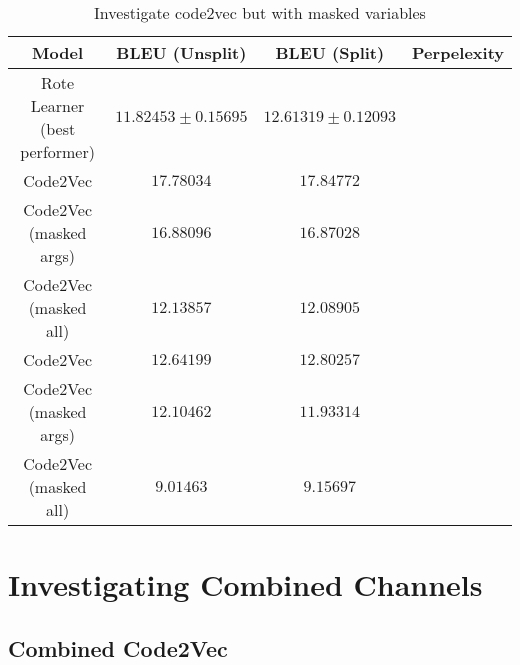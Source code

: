 \begin{table}[h!]
\begin{center}
\begin{tabular}{ c | c | c | c }
    Model                             & BLEU (Unsplit)  & BLEU (Split)    & Perpelexity \\
    \hline
    Rote Learner (best performer)          & $ 11.82453 \pm  0.15695 $ & $ 12.61319 \pm 0.12093 $ & \\
    \hline
    Code2Vec                              & $ 17.78034 $ & $ 17.84772 $ & \\
    Code2Vec (masked args)                & $ 16.88096 $ & $ 16.87028 $ & \\
    Code2Vec (masked all)                 & $ 12.13857 $ & $ 12.08905 $ & \\
    \hdashline

    Code2Vec                              & $ 12.64199 $ & $ 12.80257 $ & \\
    Code2Vec (masked args)                & $ 12.10462 $ & $ 11.93314 $ & \\
    Code2Vec (masked all)                 & $ 9.01463 $ & $ 9.15697 $ & \\
    \hline
\end{tabular}
\caption {Investigate code2vec but with masked variables}
\label{table:code_2_vec_masked}
\end{center}
\end{table}


\section{Investigating Combined Channels} %
\label{sec:investigating_combined_channels}

\subsection{Combined Code2Vec } %
\label{sub:combined_code2vec}



